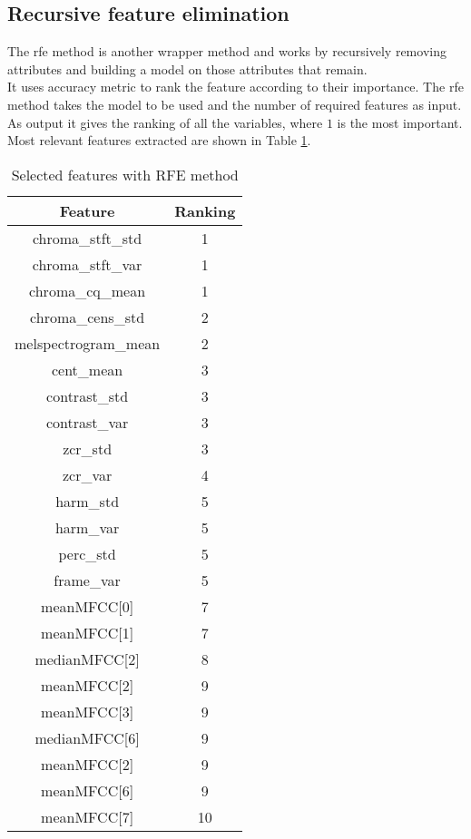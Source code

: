\subsection{Recursive feature elimination}
The \gls{rfe} method is another wrapper method and works by recursively removing attributes and building a model on those attributes that remain.
\\
It uses accuracy metric to rank the feature according to their importance. The \gls{rfe} method takes the model to be used and the number of required features as input. As output it gives the ranking of all the variables, where $1$ is the most important.
\\
Most relevant features extracted are shown in Table \ref{table:rfe_features}.
\begin{table}[h!]
	\centering
	\begin{tabular}{|c|c|}
		\hline
		Feature & Ranking\\ [0.5ex] 
		\hline\hline chroma\_stft\_std & 1 \\
		\hline chroma\_stft\_var & 1 \\
		\hline chroma\_cq\_mean & 1 \\
		\hline chroma\_cens\_std & 2\\
		\hline melspectrogram\_mean & 2\\
		\hline cent\_mean & 3\\
		\hline contrast\_std & 3\\
		\hline contrast\_var & 3\\
		\hline zcr\_std & 3 \\
		\hline zcr\_var & 4 \\
		\hline harm\_std & 5 \\
		\hline harm\_var & 5 \\
		\hline perc\_std & 5 \\
		\hline frame\_var & 5 \\
		\hline meanMFCC[0] & 7 \\
		\hline meanMFCC[1] & 7 \\
		\hline medianMFCC[2] & 8 \\
		\hline meanMFCC[2] & 9 \\
		\hline meanMFCC[3] & 9 \\
		\hline medianMFCC[6] & 9 \\
		\hline meanMFCC[2] & 9 \\
		\hline meanMFCC[6] & 9 \\
		\hline meanMFCC[7] & 10 \\
		\hline
	\end{tabular}
	\caption{Selected features with RFE method}
	\label{table:rfe_features}
\end{table}

